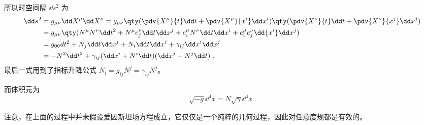 所以时空间隔 $\dd s^2$ 为
\begin{equation}
\begin{aligned}
\dd s^2&=g_{\mu\nu}\dd X^\mu\dd X^\nu=g_{\mu\nu}\qty(\pdv{X^\mu}{t}\dd t+\pdv{X^\mu}{x^i}\dd x^i)\qty(\pdv{X^\nu}{t}\dd t+\pdv{X^\nu}{x^j}\dd x^j)\\
&=g_{\mu\nu}\qty(N^\mu N^\nu\dd t^2+N^\mu e^\nu_j\dd t\dd x^j+e^\mu_iN^\nu\dd t\dd x^i+e^{\mu}_ie^{\nu}_j\dd {x^i}\dd x^j)\\
&=g_{00}dt^2+N_j\dd t\dd x^j+N_i\dd t\dd x^i+\gamma_{ij}\dd x^i\dd x^j\\
&=-N^2\dd t^2+\gamma_{ij}(\dd x^i+N^i\dd t)(\dd x^j+N^j\dd t)~,
\end{aligned}
\end{equation}
最后一式用到了指标升降公式 $N_i=g_{ij}N^j=\gamma_{ij}N^j$。

而体积元为
\begin{equation}\label{eq_ADMF_4}
\sqrt{-g}{\dd}^4 x=N\sqrt{\gamma}{\dd}^4x~.
\end{equation}


注意，在上面的过程中并未假设爱因斯坦场方程成立，它仅仅是一个纯粹的几何过程，因此对任意度规都是有效的。
